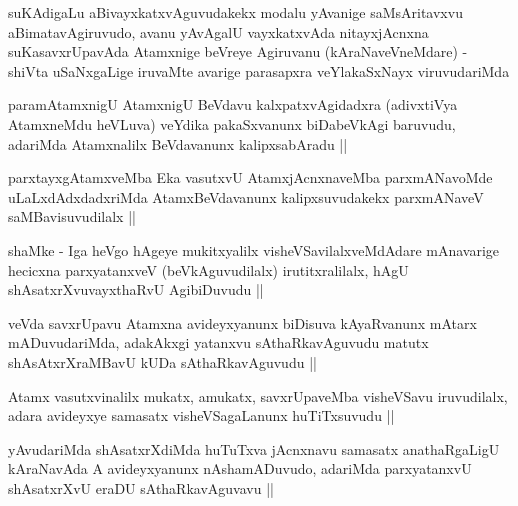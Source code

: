 
\begin{artha}
suKAdigaLu aBivayxkatxvAguvudakekx modalu yAvanige saMsAritavxvu
aBimatavAgiruvudo, avanu yAvAgalU vayxkatxvAda nitayxjAcnxna
suKasavxrUpavAda Atamxnige beVreye Agiruvanu (kAraNaveVneMdare) -
shiVta uSaNxgaLige iruvaMte avarige parasapxra veYlakaSxNayx
viruvudariMda 
\end{artha}

\begin{artha}
paramAtamxnigU AtamxnigU BeVdavu kalxpatxvAgidadxra (adivxtiVya
AtamxneMdu heVLuva) veYdika pakaSxvanunx biDabeVkAgi baruvudu,
adariMda Atamxnalilx BeVdavanunx kalipxsabAradu ||
\end{artha}


\begin{artha}
parxtayxgAtamxveMba Eka vasutxvU AtamxjAcnxnaveMba parxmANavoMde
uLaLxdAdxdadxriMda AtamxBeVdavanunx kalipxsuvudakekx parxmANaveV
saMBavisuvudilalx ||
\end{artha}

\begin{artha}
shaMke - Iga heVgo hAgeye mukitxyalilx visheVSavilalxveMdAdare
mAnavarige hecicxna parxyatanxveV (beVkAguvudilalx) irutitxralilalx,
hAgU shAsatxrXvuvayxthaRvU AgibiDuvudu ||
\end{artha}


\begin{artha}
veVda savxrUpavu Atamxna avideyxyanunx biDisuva kAyaRvanunx mAtarx
mADuvudariMda, adakAkxgi yatanxvu sAthaRkavAguvudu matutx
shAsAtxrXraMBavU kUDa sAthaRkavAguvudu ||
\end{artha}

\begin{artha}
Atamx vasutxvinalilx mukatx, amukatx, savxrUpaveMba visheVSavu
iruvudilalx, adara avideyxye samasatx visheVSagaLanunx huTiTxsuvudu ||
\end{artha}

\begin{artha}
yAvudariMda shAsatxrXdiMda huTuTxva jAcnxnavu samasatx anathaRgaLigU
kAraNavAda A avideyxyanunx nAshamADuvudo, adariMda parxyatanxvU
shAsatxrXvU eraDU sAthaRkavAguvavu ||
\end{artha}


